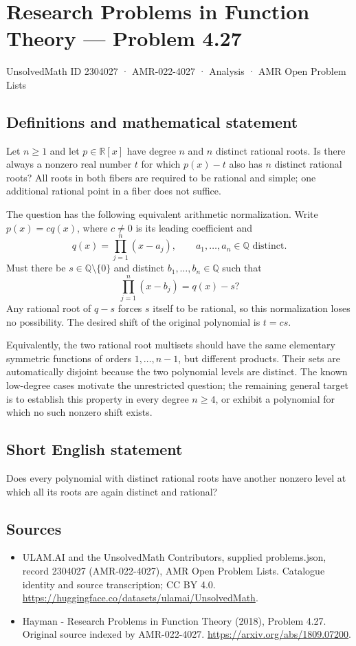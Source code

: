 \documentclass[11pt,a4paper]{article}
\begin{document}
\section*{Research Problems in Function Theory — Problem 4.27}\label{2304027}
{\small UnsolvedMath ID 2304027 · AMR-022-4027 · Analysis · AMR Open Problem Lists}
\subsection{Definitions and mathematical statement}
Let $n\geq1$ and let $p\in\mathbb R[x]$ have degree $n$ and
$n$ distinct rational roots. Is there always a nonzero real
number $t$ for which $p(x)-t$ also has $n$ distinct rational roots?
All roots in both fibers are required to be rational and simple;
one additional rational point in a fiber does not suffice.

The question has the following equivalent arithmetic normalization.
Write $p(x)=c q(x)$, where $c\ne0$ is its leading coefficient and
\[
 q(x)=\prod_{j=1}^{n}(x-a_j),\qquad
 a_1,\ldots,a_n\in\mathbb Q\text{ distinct}.
\]
Must there be $s\in\mathbb Q\setminus\{0\}$ and distinct
$b_1,\ldots,b_n\in\mathbb Q$ such that
\[
 \prod_{j=1}^{n}(x-b_j)=q(x)-s?
\]
Any rational root of $q-s$ forces $s$ itself to be rational,
so this normalization loses no possibility. The desired shift
of the original polynomial is $t=cs$.

Equivalently, the two rational root multisets should have the
same elementary symmetric functions of orders $1,\ldots,n-1$,
but different products. Their sets are automatically disjoint
because the two polynomial levels are distinct. The known
low-degree cases motivate the unrestricted question; the
remaining general target is to establish this property in every
degree $n\geq4$, or exhibit a polynomial for which no such
nonzero shift exists.
\subsection{Short English statement}
Does every polynomial with distinct rational roots have another nonzero level at which all its roots are again distinct and rational?
\subsection{Sources}
\begin{itemize}
\item[S1] ULAM.AI and the UnsolvedMath Contributors, supplied problems.json, record 2304027 (AMR-022-4027), AMR Open Problem Lists. Catalogue identity and source transcription; CC BY 4.0.
\url{https://huggingface.co/datasets/ulamai/UnsolvedMath}.
\item[S2] Hayman - Research Problems in Function Theory (2018), Problem 4.27. Original source indexed by AMR-022-4027.
\url{https://arxiv.org/abs/1809.07200}.
\end{itemize}
\end{document}
